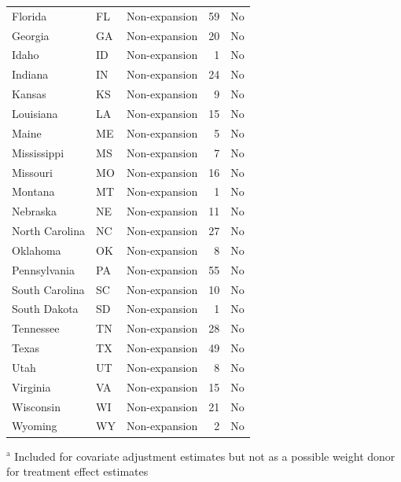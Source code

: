 \begin{table}[ht]
\begin{tabular}{lllrl}
  Florida & FL & Non-expansion &  59 & No \\ 
  Georgia & GA & Non-expansion &  20 & No \\ 
  Idaho & ID & Non-expansion &   1 & No \\ 
  Indiana & IN & Non-expansion &  24 & No \\ 
  Kansas & KS & Non-expansion &   9 & No \\ 
  Louisiana & LA & Non-expansion &  15 & No \\ 
  Maine & ME & Non-expansion &   5 & No \\ 
  Mississippi & MS & Non-expansion &   7 & No \\ 
  Missouri & MO & Non-expansion &  16 & No \\ 
  Montana & MT & Non-expansion &   1 & No \\ 
  Nebraska & NE & Non-expansion &  11 & No \\ 
  North Carolina & NC & Non-expansion &  27 & No \\ 
  Oklahoma & OK & Non-expansion &   8 & No \\ 
  Pennsylvania & PA & Non-expansion &  55 & No \\ 
  South Carolina & SC & Non-expansion &  10 & No \\ 
  South Dakota & SD & Non-expansion &   1 & No \\ 
  Tennessee & TN & Non-expansion &  28 & No \\ 
  Texas & TX & Non-expansion &  49 & No \\ 
  Utah & UT & Non-expansion &   8 & No \\ 
  Virginia & VA & Non-expansion &  15 & No \\ 
  Wisconsin & WI & Non-expansion &  21 & No \\ 
  Wyoming & WY & Non-expansion &   2 & No \\ 
   \hline
\end{tabular}
     \vspace{1ex}
     \newline
     {\raggedright $^\textrm{a}$ Included for covariate adjustment estimates but not as a possible weight donor for treatment effect estimates \par }
\end{table}

